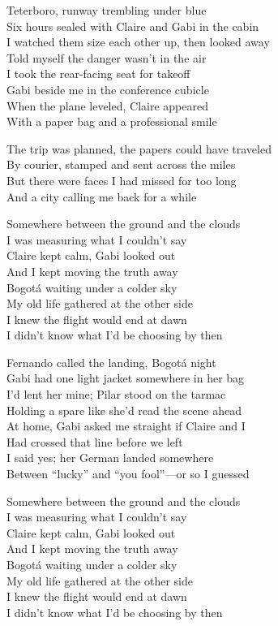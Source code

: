 \begin{lyrics}
Teterboro, runway trembling under blue\\
Six hours sealed with Claire and Gabi in the cabin\\
I watched them size each other up, then looked away\\
Told myself the danger wasn’t in the air\\
I took the rear-facing seat for takeoff\\
Gabi beside me in the conference cubicle\\
When the plane leveled, Claire appeared\\
With a paper bag and a professional smile

The trip was planned, the papers could have traveled\\
By courier, stamped and sent across the miles\\
But there were faces I had missed for too long\\
And a city calling me back for a while

Somewhere between the ground and the clouds\\
I was measuring what I couldn’t say\\
Claire kept calm, Gabi looked out\\
And I kept moving the truth away\\
Bogotá waiting under a colder sky\\
My old life gathered at the other side\\
I knew the flight would end at dawn\\
I didn’t know what I’d be choosing by then

Fernando called the landing, Bogotá night\\
Gabi had one light jacket somewhere in her bag\\
I’d lent her mine; Pilar stood on the tarmac\\
Holding a spare like she’d read the scene ahead\\
At home, Gabi asked me straight if Claire and I\\
Had crossed that line before we left\\
I said yes; her German landed somewhere\\
Between “lucky” and “you fool”—or so I guessed

Somewhere between the ground and the clouds\\
I was measuring what I couldn’t say\\
Claire kept calm, Gabi looked out\\
And I kept moving the truth away\\
Bogotá waiting under a colder sky\\
My old life gathered at the other side\\
I knew the flight would end at dawn\\
I didn’t know what I’d be choosing by then


\end{lyrics}

